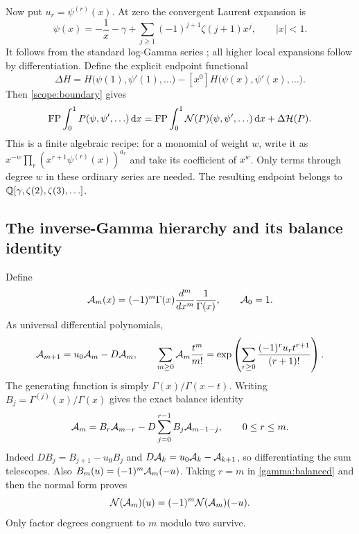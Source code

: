 Now put $u_r=\psi^{(r)}(x)$.  At zero the convergent Laurent expansion is
\begin{equation}\label{gamma:local}
 \psi(x)=-\frac1x-\gamma+
       \sum_{j\ge1}(-1)^{j+1}\zeta(j+1)x^j,
       \qquad |x|<1.
\end{equation}
It follows from the standard log-Gamma series \cite[\S5.7]{DLMF};
all higher local expansions follow by differentiation.
Define the explicit endpoint functional
\begin{equation}\label{gamma:Delta}
 \Delta H=H\bigl(\psi(1),\psi'(1),\ldots\bigr)
             -[x^0]H\bigl(\psi(x),\psi'(x),\ldots\bigr).
\end{equation}
Then \eqref{scope:boundary} gives
\begin{equation}\label{gamma:fp-normal}
 \operatorname{FP}\int_0^1P(\psi,\psi',\ldots)\,\mathrm d x
 =\operatorname{FP}\int_0^1\mathcal N(P)(\psi,\psi',\ldots)\,\mathrm d x+\Delta\mathcal H(P).
\end{equation}
This is a finite algebraic recipe: for a monomial of weight $w$, write
it as $x^{-w}\prod_r(x^{r+1}\psi^{(r)}(x))^{a_r}$ and take its
coefficient of $x^w$.  Only terms through degree $w$ in these ordinary
series are needed.  The resulting endpoint belongs to
$\mathbb Q[\gamma,\zeta(2),\zeta(3),\ldots]$.

\subsection{The inverse-Gamma hierarchy and its balance identity}

Define
\begin{equation}\label{gamma:A}
 \mathcal A_m(x)=(-1)^m\Gamma(x)\frac{d^m}{dx^m}\frac1{\Gamma(x)},
 \qquad \mathcal A_0=1.
\end{equation}
As universal differential polynomials,
\begin{equation}\label{gamma:recurrence}
 \mathcal A_{m+1}=u_0\mathcal A_m-D\mathcal A_m,
 \qquad
 \sum_{m\ge0}\mathcal A_m\frac{t^m}{m!}
 =\exp\left(\sum_{r\ge0}\frac{(-1)^ru_rt^{r+1}}{(r+1)!}\right).
\end{equation}
The generating function is simply $\Gamma(x)/\Gamma(x-t)$.
Writing $B_j=\Gamma^{(j)}(x)/\Gamma(x)$ gives the exact balance
identity
\begin{equation}\label{gamma:balanced}
 \mathcal A_m=B_r\mathcal A_{m-r}
       -D\sum_{j=0}^{r-1}B_j\mathcal A_{m-1-j},\qquad 0\le r\le m.
\end{equation}
Indeed $DB_j=B_{j+1}-u_0B_j$ and
$D\mathcal A_k=u_0\mathcal A_k-\mathcal A_{k+1}$, so differentiating the sum telescopes.
Also $B_m(u)=(-1)^m\mathcal A_m(-u)$.  Taking $r=m$ in
\eqref{gamma:balanced} and then the normal form proves
\begin{equation}\label{gamma:parity}
 \mathcal N(\mathcal A_m)(u)=(-1)^m\mathcal N(\mathcal A_m)(-u).
\end{equation}
Only factor degrees congruent to $m$ modulo two survive.

